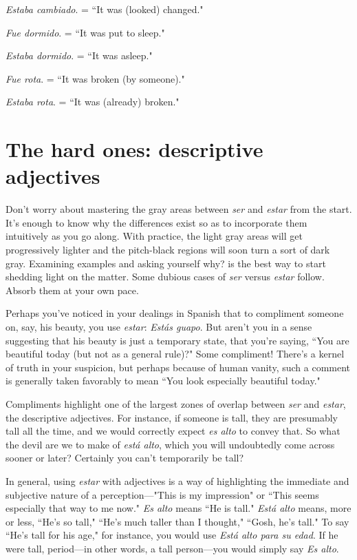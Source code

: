 \indu \emph{Estaba cambiado}. = ``It was (looked) changed." 

\indu \emph{Fue dormido}. = ``It was put to sleep."

\indu \emph{Estaba dormido}. = ``It was asleep."

\indu \emph{Fue rota}. = ``It was broken (by someone)."

\indu \emph{Estaba rota}. = ``It was (already) broken."

\section{The hard ones: descriptive adjectives}

Don't worry about mastering the gray areas between \emph{ser} and
\emph{estar} from the start. It's enough to know why the differences exist so
as to incorporate them intuitively as you go along. With practice, the
light gray areas will get progressively lighter and the pitch-black regions will soon turn a sort of dark gray. Examining examples and asking yourself why? is the best way to start shedding light on the matter.
Some dubious cases of \emph{ser} versus \emph{estar} follow. Absorb them at your
own pace.

Perhaps you've noticed in your dealings in Spanish that to compliment someone on, say, his beauty, you use \emph{estar}: \emph{Estás guapo}. But
aren't you in a sense suggesting that his beauty is just a temporary
state, that you're saying, ``You are beautiful today (but not as a general
rule)?" Some compliment! There's a kernel of truth in your suspicion,
but perhaps because of human vanity, such a comment is generally
taken favorably to mean ``You look especially beautiful today."

Compliments highlight one of the largest zones of overlap between \emph{ser} and \emph{estar}, the descriptive adjectives. For instance, if someone is tall, they are presumably tall all the time, and we would correctly expect \emph{es alto} to convey that. So what the devil are we to make
of \emph{está alto}, which you will undoubtedly come across sooner or later?
Certainly you can't temporarily be tall?

In general, using \emph{estar} with adjectives is a way of highlighting
the immediate and subjective nature of a perception---"This is my
impression" or ``This seems especially that way to me now." \emph{Es alto}
means ``He is tall." \emph{Está alto} means, more or less, ``He's so tall," ``He's
much taller than I thought," ``Gosh, he's tall." To say ``He's tall for his
age," for instance, you would use \emph{Está alto para su edad}. If he were
tall, period---in other words, a tall person---you would simply say
\emph{Es alto}.

